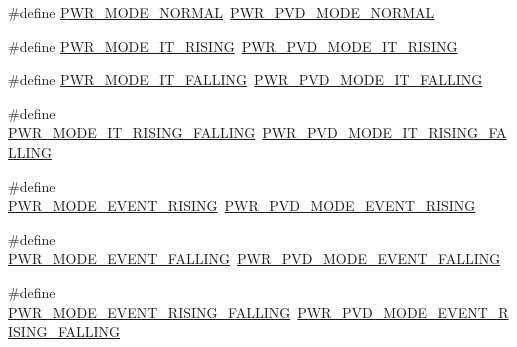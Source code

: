 \begin{DoxyCompactItemize}
\item 
\#define \hyperlink{group___h_a_l___p_w_r___aliased_ga7c173d32b42f94bf35a331ff6b52fc00}{P\+W\+R\+\_\+\+M\+O\+D\+E\+\_\+\+N\+O\+R\+M\+AL}~\hyperlink{group___p_w_r___p_v_d___mode_ga3a4bf701a36a14a4edf4dc5a28153277}{P\+W\+R\+\_\+\+P\+V\+D\+\_\+\+M\+O\+D\+E\+\_\+\+N\+O\+R\+M\+AL}
\item 
\#define \hyperlink{group___h_a_l___p_w_r___aliased_gac7ab4dbca1cfe28383f89d0356b25da7}{P\+W\+R\+\_\+\+M\+O\+D\+E\+\_\+\+I\+T\+\_\+\+R\+I\+S\+I\+NG}~\hyperlink{group___p_w_r___p_v_d___mode_ga102d7b8354419990a2a780f61cd020a6}{P\+W\+R\+\_\+\+P\+V\+D\+\_\+\+M\+O\+D\+E\+\_\+\+I\+T\+\_\+\+R\+I\+S\+I\+NG}
\item 
\#define \hyperlink{group___h_a_l___p_w_r___aliased_ga9057a67887ea202b2db8da7064008fab}{P\+W\+R\+\_\+\+M\+O\+D\+E\+\_\+\+I\+T\+\_\+\+F\+A\+L\+L\+I\+NG}~\hyperlink{group___p_w_r___p_v_d___mode_gab600a54f3a588de836cfe4b727ab8a53}{P\+W\+R\+\_\+\+P\+V\+D\+\_\+\+M\+O\+D\+E\+\_\+\+I\+T\+\_\+\+F\+A\+L\+L\+I\+NG}
\item 
\#define \hyperlink{group___h_a_l___p_w_r___aliased_ga97e8abb320b4be192e23c520e74d01a9}{P\+W\+R\+\_\+\+M\+O\+D\+E\+\_\+\+I\+T\+\_\+\+R\+I\+S\+I\+N\+G\+\_\+\+F\+A\+L\+L\+I\+NG}~\hyperlink{group___p_w_r___p_v_d___mode_gac531fbf14457e6595505354fad521b67}{P\+W\+R\+\_\+\+P\+V\+D\+\_\+\+M\+O\+D\+E\+\_\+\+I\+T\+\_\+\+R\+I\+S\+I\+N\+G\+\_\+\+F\+A\+L\+L\+I\+NG}
\item 
\#define \hyperlink{group___h_a_l___p_w_r___aliased_gaca42d0e80c82d3f35ec7b07227fb8b7f}{P\+W\+R\+\_\+\+M\+O\+D\+E\+\_\+\+E\+V\+E\+N\+T\+\_\+\+R\+I\+S\+I\+NG}~\hyperlink{group___p_w_r___p_v_d___mode_ga1a946b01887aa886de329a92c3ab0dd4}{P\+W\+R\+\_\+\+P\+V\+D\+\_\+\+M\+O\+D\+E\+\_\+\+E\+V\+E\+N\+T\+\_\+\+R\+I\+S\+I\+NG}
\item 
\#define \hyperlink{group___h_a_l___p_w_r___aliased_gaa37ffde31fc0bdadb0ed77a9588034dd}{P\+W\+R\+\_\+\+M\+O\+D\+E\+\_\+\+E\+V\+E\+N\+T\+\_\+\+F\+A\+L\+L\+I\+NG}~\hyperlink{group___p_w_r___p_v_d___mode_gaaedbe45f1a1ea6c30af6ac51abae0cae}{P\+W\+R\+\_\+\+P\+V\+D\+\_\+\+M\+O\+D\+E\+\_\+\+E\+V\+E\+N\+T\+\_\+\+F\+A\+L\+L\+I\+NG}
\item 
\#define \hyperlink{group___h_a_l___p_w_r___aliased_ga87c794b332bd1b39496a35613344a4cc}{P\+W\+R\+\_\+\+M\+O\+D\+E\+\_\+\+E\+V\+E\+N\+T\+\_\+\+R\+I\+S\+I\+N\+G\+\_\+\+F\+A\+L\+L\+I\+NG}~\hyperlink{group___p_w_r___p_v_d___mode_ga7455387c8e9049f9f66b46423d4f4091}{P\+W\+R\+\_\+\+P\+V\+D\+\_\+\+M\+O\+D\+E\+\_\+\+E\+V\+E\+N\+T\+\_\+\+R\+I\+S\+I\+N\+G\+\_\+\+F\+A\+L\+L\+I\+NG}
\item 

\end{DoxyCompactItemize}
